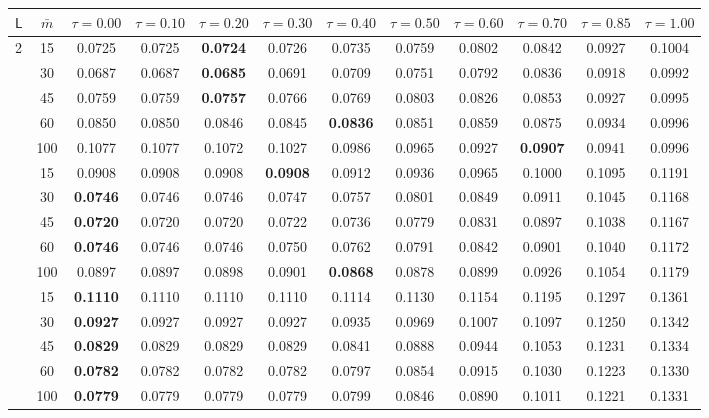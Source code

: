 \begin{tabular}{lccccccccccc}
\toprule
$\mathsf L$ & $\bar m$ & $\tau=0.00$ & $\tau=0.10$ & $\tau=0.20$ & $\tau=0.30$ & $\tau=0.40$ & $\tau=0.50$ & $\tau=0.60$ & $\tau=0.70$ & $\tau=0.85$ & $\tau=1.00$ \\
\midrule
2 & 15 & 0.0725 & 0.0725 & \textbf{0.0724} & 0.0726 & 0.0735 & 0.0759 & 0.0802 & 0.0842 & 0.0927 & 0.1004 \\
 & 30 & 0.0687 & 0.0687 & \textbf{0.0685} & 0.0691 & 0.0709 & 0.0751 & 0.0792 & 0.0836 & 0.0918 & 0.0992 \\
 & 45 & 0.0759 & 0.0759 & \textbf{0.0757} & 0.0766 & 0.0769 & 0.0803 & 0.0826 & 0.0853 & 0.0927 & 0.0995 \\
 & 60 & 0.0850 & 0.0850 & 0.0846 & 0.0845 & \textbf{0.0836} & 0.0851 & 0.0859 & 0.0875 & 0.0934 & 0.0996 \\
 & 100 & 0.1077 & 0.1077 & 0.1072 & 0.1027 & 0.0986 & 0.0965 & 0.0927 & \textbf{0.0907} & 0.0941 & 0.0996 \\
\addlinespace
3 & 15 & 0.0908 & 0.0908 & 0.0908 & \textbf{0.0908} & 0.0912 & 0.0936 & 0.0965 & 0.1000 & 0.1095 & 0.1191 \\
 & 30 & \textbf{0.0746} & 0.0746 & 0.0746 & 0.0747 & 0.0757 & 0.0801 & 0.0849 & 0.0911 & 0.1045 & 0.1168 \\
 & 45 & \textbf{0.0720} & 0.0720 & 0.0720 & 0.0722 & 0.0736 & 0.0779 & 0.0831 & 0.0897 & 0.1038 & 0.1167 \\
 & 60 & \textbf{0.0746} & 0.0746 & 0.0746 & 0.0750 & 0.0762 & 0.0791 & 0.0842 & 0.0901 & 0.1040 & 0.1172 \\
 & 100 & 0.0897 & 0.0897 & 0.0898 & 0.0901 & \textbf{0.0868} & 0.0878 & 0.0899 & 0.0926 & 0.1054 & 0.1179 \\
\addlinespace
4 & 15 & \textbf{0.1110} & 0.1110 & 0.1110 & 0.1110 & 0.1114 & 0.1130 & 0.1154 & 0.1195 & 0.1297 & 0.1361 \\
 & 30 & \textbf{0.0927} & 0.0927 & 0.0927 & 0.0927 & 0.0935 & 0.0969 & 0.1007 & 0.1097 & 0.1250 & 0.1342 \\
 & 45 & \textbf{0.0829} & 0.0829 & 0.0829 & 0.0829 & 0.0841 & 0.0888 & 0.0944 & 0.1053 & 0.1231 & 0.1334 \\
 & 60 & \textbf{0.0782} & 0.0782 & 0.0782 & 0.0782 & 0.0797 & 0.0854 & 0.0915 & 0.1030 & 0.1223 & 0.1330 \\
 & 100 & \textbf{0.0779} & 0.0779 & 0.0779 & 0.0779 & 0.0799 & 0.0846 & 0.0890 & 0.1011 & 0.1221 & 0.1331 \\
\bottomrule
\end{tabular}
